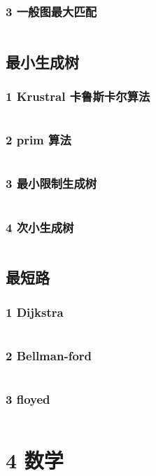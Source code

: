 \documentclass{article}
\begin{document}
\subsubsection{3 一般图最大匹配}
\inputminted{c++}{/home/zzuzxy/t3/ACM-template/3 图论/二分图/3 一般图最大匹配.cpp}
\subsection{最小生成树}
\subsubsection{1 Krustral 卡鲁斯卡尔算法}
\inputminted{c++}{/home/zzuzxy/t3/ACM-template/3 图论/最小生成树/1 Krustral 卡鲁斯卡尔算法.cpp}
\subsubsection{2 prim 算法}
\inputminted{c++}{/home/zzuzxy/t3/ACM-template/3 图论/最小生成树/2 prim 算法.cpp}
\subsubsection{3 最小限制生成树}
\inputminted{c++}{/home/zzuzxy/t3/ACM-template/3 图论/最小生成树/3 最小限制生成树.cpp}
\subsubsection{4 次小生成树}
\inputminted{c++}{/home/zzuzxy/t3/ACM-template/3 图论/最小生成树/4 次小生成树.cpp}
\subsection{最短路}
\subsubsection{1 Dijkstra}
\inputminted{c++}{/home/zzuzxy/t3/ACM-template/3 图论/最短路/1 Dijkstra.cpp}
\subsubsection{2 Bellman-ford}
\inputminted{c++}{/home/zzuzxy/t3/ACM-template/3 图论/最短路/2 Bellman-ford.cpp}
\subsubsection{3 floyed}
\inputminted{c++}{/home/zzuzxy/t3/ACM-template/3 图论/最短路/3 floyed.cpp}
\section{4 数学}
\end{document}
